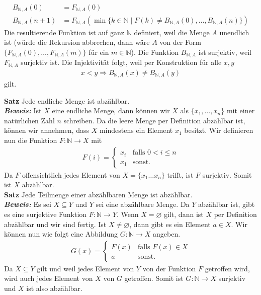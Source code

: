 \begin{itemize}
	      \begin{align*}
		      B_{\mathbb{N},A}(0)   & = F_{\mathbb{N},A}(0)                                                                                  \\
		      B_{\mathbb{N},A}(n+1) & = F_{\mathbb{N},A}(\min\{k\in\mathbb{N}\mid F(k)\neq B_{\mathbb{N},A}(0),\dots,B_{\mathbb{N},A}(n) \})
	      \end{align*}
	      Die resultierende Funktion ist auf ganz $\mathbb{N}$ definiert, weil die Menge $A$ unendlich ist (würde die Rekursion abbrechen, dann wäre $A$ von der Form $\{F_{\mathbb{N},A}(0),\dots,F_{\mathbb{N},A}(m)\}$ für ein $m\in\mathbb{N}$). Die Funktion $B_{\mathbb{N},A}$ ist surjektiv, weil $F_{\mathbb{N},A}$ surjektiv ist. Die Injektivität folgt, weil per Konstruktion für alle $x,y$
	      \begin{align*}
		      x<y \Rightarrow B_{\mathbb{N},A}(x) \neq B_{\mathbb{N},A}(y)
	      \end{align*}
	      gilt.\qedhere
\end{itemize}
\textbf{Satz } Jede endliche Menge ist abzählbar. \\
\textit{\textbf{Beweis: }}
Ist $X$ eine endliche Menge, dann können wir $X$ als $\{x_1,\dots,x_n\}$ mit einer natürlichen Zahl $n$ schreiben. Da die leere Menge per Definition abzählbar ist, können wir annehmen, dass $X$ mindestens ein Element $x_1$ besitzt. Wir definieren nun die Funktion $F:\mathbb{N}\to X$ mit
\begin{align*}
	F(i)=\begin{cases}
		x_i & \text{falls }0<i\leq n \\
		x_1 & \text{sonst.}
	\end{cases}
\end{align*}
Da $F$ offensichtlich jedes Element von $X=\{x_1\dots x_n\}$ trifft, ist $F$ surjektiv. Somit ist $X$ abzählbar. \\

\textbf{Satz } Jede Teilmenge einer abzählbaren Menge ist abzählbar.\\
\textit{\textbf{Beweis: }}
Es sei $X\subseteq Y$ und $Y$ sei eine abzählbare Menge. Da $Y$ abzählbar ist,
gibt es eine surjektive Funktion $F:\mathbb{N}\to Y$. Wenn $X=\varnothing$ gilt, dann
ist $X$ per Definition abzählbar und wir sind fertig. Ist $X\neq\varnothing$,
dann gibt es ein Element $a\in X$. Wir können nun wie folgt eine Abbildung
$G:\mathbb{N}\to X$ angeben.
\begin{align*}
	G(x)=\begin{cases}
		F(x) & \text{falls }F(x)\in X \\
		a    & \text{sonst.}
	\end{cases}
\end{align*}
Da $X\subseteq Y$ gilt und weil jedes Element von $Y$ von der Funktion $F$
getroffen wird, wird auch jedes Element von $X$ von $G$ getroffen. Somit
ist $G:\mathbb{N}\to X$ surjektiv und $X$ ist also abzählbar. \\

